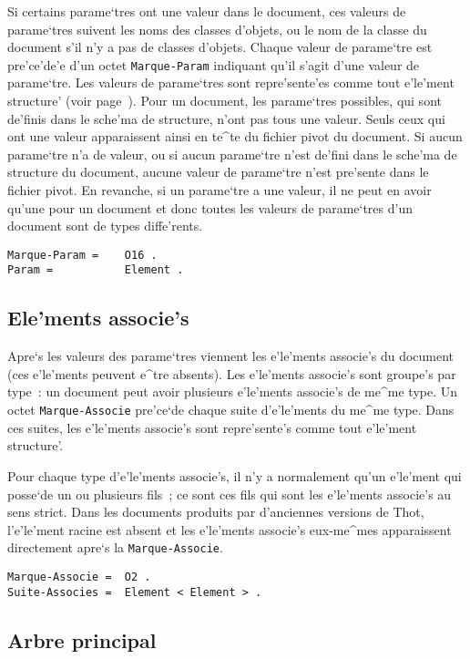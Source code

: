 Si certains parame`tres ont une valeur dans le document, ces valeurs de
parame`tres suivent les noms des classes d'objets, ou le nom de la classe du
document s'il n'y a pas de classes d'objets. Chaque valeur de
parame`tre est pre'ce'de'e d'un octet {\tt Marque-Param} indiquant qu'il
s'agit d'une valeur de parame`tre. Les valeurs de parame`tres sont
repre'sente'es comme tout e'le'ment structure' (voir page~\pageref{elstruct}).
Pour un document,
les parame`tres possibles, qui sont de'finis dans le sche'ma de structure,
n'ont pas tous une valeur. Seuls ceux qui ont une valeur apparaissent ainsi
en te^te du fichier pivot du document. Si aucun parame`tre n'a de
valeur, ou si aucun parame`tre n'est de'fini dans le sche'ma de structure du
document, aucune valeur de parame`tre n'est pre'sente dans le fichier
pivot. En revanche, si un parame`tre a une valeur, il ne peut en avoir qu'une
pour un document et donc toutes les valeurs de parame`tres d'un document sont
de types diffe'rents.

\begin{verbatim}
Marque-Param =    O16 .
Param =           Element .
\end{verbatim}

\subsection{Ele'ments associe's}

Apre`s les valeurs des parame`tres viennent les e'le'ments associe's du document
(ces e'le'ments peuvent e^tre absents). Les e'le'ments associe's sont groupe's
par type~: un document peut avoir plusieurs e'le'ments associe's de me^me type.
Un octet {\tt Marque-Associe} pre'ce`de chaque suite d'e'le'ments du me^me
type. Dans ces suites, les e'le'ments associe's sont repre'sente's comme tout
e'le'ment structure'.

Pour chaque type d'e'le'ments associe's, il n'y a normalement qu'un e'le'ment
qui posse`de un ou plusieurs fils~; ce sont ces fils qui sont les e'le'ments
associe's au sens strict. Dans les documents produits par d'anciennes versions
de Thot, l'e'le'ment racine est absent et les e'le'ments associe's eux-me^mes
apparaissent directement apre`s la {\tt Marque-Associe}.

\begin{verbatim}
Marque-Associe =  O2 .
Suite-Associes =  Element < Element > .
\end{verbatim}

\subsection{Arbre principal}

